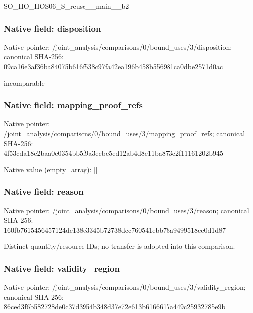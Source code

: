 \documentclass[10pt,a4paper]{article}
\begin{document}
\begingroup\raggedright\sloppy SO\_\allowbreak{}HO\_\allowbreak{}HOS06\_\allowbreak{}S\_\allowbreak{}reuse\_\allowbreak{}\_\allowbreak{}main\_\allowbreak{}\_\allowbreak{}b2\par\endgroup

\subsubsection{Native field: disposition}
Native pointer: /joint\_\allowbreak{}analysis/comparisons/0/bound\_\allowbreak{}uses/3/disposition; canonical SHA-256: 09ca16e3af36ba84075b616f538c97fa42ea196b458b556981ca0dbe2571d0ac

\begingroup\raggedright\sloppy incomparable\par\endgroup

\subsubsection{Native field: mapping\_\allowbreak{}proof\_\allowbreak{}refs}
Native pointer: /joint\_\allowbreak{}analysis/comparisons/0/bound\_\allowbreak{}uses/3/mapping\_\allowbreak{}proof\_\allowbreak{}refs; canonical SHA-256: 4f53cda18c2baa0c0354bb5f9a3ecbe5ed12ab4d8e11ba873c2f11161202b945

Native value (empty\_\allowbreak{}array): []

\subsubsection{Native field: reason}
Native pointer: /joint\_\allowbreak{}analysis/comparisons/0/bound\_\allowbreak{}uses/3/reason; canonical SHA-256: 160fb7615456457124de138e3345b72738dcc760541ebb78a9499518cc0d1d87

\begingroup\raggedright\sloppy Distinct quantity/\allowbreak{}resource IDs;\allowbreak{} no transfer is adopted into this comparison.\par\endgroup

\subsubsection{Native field: validity\_\allowbreak{}region}
Native pointer: /joint\_\allowbreak{}analysis/comparisons/0/bound\_\allowbreak{}uses/3/validity\_\allowbreak{}region; canonical SHA-256: 86ced3f6b582728de0c37d3954b348d37e72e613b6166617a449c25932785e9b
\end{document}
